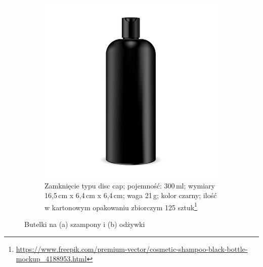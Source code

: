 \begin{figure}[h]
\begin{subfigure}[t]{0.45\textwidth}
	\includegraphics[width=\textwidth]{./sec9/butelka2.jpg}
		\caption{Zamknięcie typu disc cap; pojemność: 300\,ml; wymiary 16,5\,cm x 6,4\,cm x 6,4\,cm; waga 21\,g; kolor czarny; ilość w kartonowym opakowaniu zbiorczym 125 sztuk\protect\footnote{\url{https://www.freepik.com/premium-vector/cosmetic-shampoo-black-bottle-mockup_4188953.html}}}
	\end{subfigure}
	\caption{Butelki na (a) szampony i (b) odżywki}
\end{figure}


